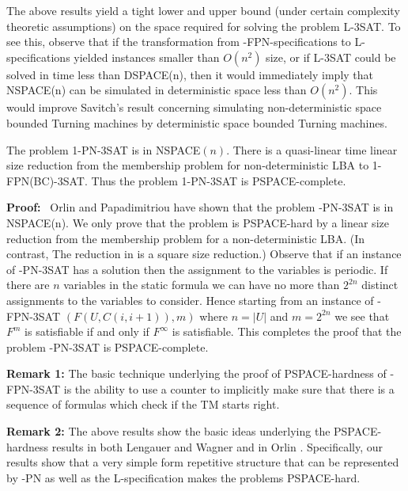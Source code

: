 \smallskip

The above results yield a tight lower and upper bound (under certain complexity 
theoretic assumptions)
on the space required for solving the problem {\sf L-3SAT}. To see this, 
observe that if the transformation from {-FPN}-specifications to
{\sf L}-specifications yielded instances smaller than $O(n^2)$ size,  or
if {\sf L-3SAT} could be solved in time less than {\sf DSPACE(n)}, 
then it would immediately imply that {\sf NSPACE(n)} can be simulated  in 
deterministic space less than $O(n^2)$. 
This would improve Savitch's \cite{Sa70} 
result concerning simulating  non-deterministic space bounded 
Turning machines by deterministic space bounded Turning machines.


\begin{corollary}\label{th:pn3sat}
The problem 1-PN-3SAT is in NSPACE$(n)$.
There is a quasi-linear
time linear size reduction from the membership problem for non-deterministic
LBA to 1-FPN(BC)-3SAT.
Thus the  problem 1-PN-3SAT is PSPACE-complete. 
\end{corollary}

\noindent
{\bf Proof:}~  
Orlin \cite{Or82a} and Papadimitriou \cite{Pa94} have shown that
the problem {-PN-3SAT} is in {\sf NSPACE(n)}. 
We only prove that the problem is {\sf PSPACE}-hard by a linear size
reduction from the membership problem for a non-deterministic {\sf LBA}.
(In contrast, The reduction in \cite{Or82a} is a square size reduction.)  
Observe that if an instance of {-PN-3SAT} has a solution
then the assignment to the variables is periodic. If there are $n$ variables
in the static formula we can have no more than $2^{2n}$ distinct assignments to
the variables to consider. 
Hence starting from  an instance of {-FPN-3SAT} 
$(F(U,C(i, i+1)),m)$ where $n = |U|$   and $m = 2^{2n}$ we  see that 
$F^m$ is satisfiable if and only if $F^{\infty}$ is satisfiable.
This completes the proof that the problem {-PN-3SAT} is 
{\sf PSPACE}-complete.\QED

\smallskip

\noindent
{\bf Remark 1:}
The basic technique underlying the proof of {\sf PSPACE}-hardness of 
{-FPN-3SAT}
is the ability to use a counter to implicitly make sure that there is a
sequence of formulas which check if the TM starts right. 

\noindent
{\bf Remark 2:} 
The above results show the basic ideas underlying the 
{\sf PSPACE}-hardness results in both Lengauer and Wagner \cite{LW92} 
and in Orlin 
\cite{Or82a}. Specifically, our results show that a very simple form 
repetitive structure that can be represented  
by {-PN} as well as the {\sf L}-specification 
makes the problems {\sf PSPACE}-hard.  

